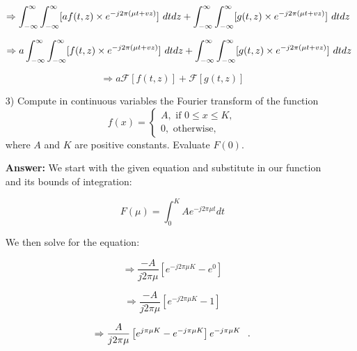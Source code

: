 \documentclass{article}
\begin{document}
\begin{enumerate}
\begin{equation}
\Rightarrow \int_{-\infty}^{\infty} \int_{-\infty}^{\infty} [af(t,z) \times e^{-j2 \pi (\mu t + vz)}] \hspace{0.05in} dtdz + \int_{-\infty}^{\infty} \int_{-\infty}^{\infty} [g(t,z) \times  e^{-j2 \pi (\mu t + vz)}] \hspace{0.05in} dtdz
\end{equation}

\begin{equation}
\Rightarrow a \int_{-\infty}^{\infty} \int_{-\infty}^{\infty} [f(t,z) \times e^{-j2 \pi (\mu t + vz)}] \hspace{0.05in} dtdz + \int_{-\infty}^{\infty} \int_{-\infty}^{\infty} [g(t,z) \times  e^{-j2 \pi (\mu t + vz)}] \hspace{0.05in} dtdz
\end{equation}

\begin{equation}
\Rightarrow a \mathcal{F}[f(t,z)] + \mathcal{F}[g(t,z)]
\end{equation}

\item[3)] Compute in continuous variables the Fourier transform of the 
function
$$f(x)=\left\{
\begin{array}{l}
A, \mbox{ if }0\leq x\leq K,\\
0, \mbox{ otherwise, }
\end{array}
\right. 
$$
where $A$ and $K$ are positive constants. Evaluate $F(0)$. 

\textbf{Answer:} We start with the given equation and substitute in our function and its bounds of integration:

$$F(\mu) = \int_{0}^{K} Ae^{-j2 \pi \mu t}dt$$

We then solve for the equation:

\begin{equation}
\Rightarrow \frac{-A}{j2\pi\mu} \left[ e^{-j2 \pi \mu K} - e^0 \right]
\end{equation}

\begin{equation}
\Rightarrow \frac{-A}{j2\pi\mu} \left[ e^{-j2 \pi \mu K} - 1 \right]
\end{equation}

\begin{equation}
\Rightarrow \frac{A}{j2 \pi \mu} \left[ e^{j \pi \mu K} - e^{-j \pi \mu K} \right] e^{-j \pi \mu K} \hspace{0.1in} .
\end{equation}


\end{enumerate}
\end{document}
